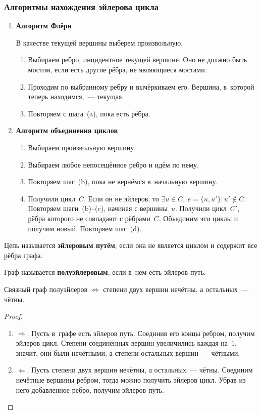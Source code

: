\subsubsection{Алгоритмы нахождения эйлерова цикла}
\begin{enumerate}
	\item {} \textbf{Алгоритм Флёри}
	
	В качестве текущей вершины выберем произвольную.
	\begin{enumerate}
		\item Выбираем ребро, инцидентное текущей вершине.
		Оно не должно быть мостом, если есть другие рёбра, не являющиеся мостами.
		\item Проходим по выбранному ребру и вычёркиваем его.
		Вершина, в~которой теперь находимся,~--- текущая.
		\item Повторяем с шага~(a), пока есть рёбра.
	\end{enumerate}
	
	\item {} \textbf{Алгоритм объединения циклов}
	\begin{enumerate}
		\item Выбираем произвольную вершину.
		\item Выбираем любое непосещённое ребро и идём по нему.
		\item Повторяем шаг~(b), пока не вернёмся в~начальную вершину.
		\item Получили цикл~$C$.
		Если он не эйлеров, то $\exists u \in C, \ e = \{ u, u' \} \colon u' \notin C$.
		Повторяем шаги~(b)--(c), начиная с вершины~$u$.
		Получили цикл~$C'$, рёбра которого не совпадают с рёбрами~$C$.
		Объединим эти циклы и получим новый.
		Повторяем шаг~(d).
	\end{enumerate}
\end{enumerate}

Цепь называется \textbf{эйлеровым путём}, если она не является циклом и содержит все рёбра графа.

 Граф называется \textbf{полуэйлеровым}, если в~нём есть эйлеров путь.

\begin{theorem}
Связный граф полуэйлеров $\Leftrightarrow$ степени двух вершин нечётны, а остальных~--- чётны.
\end{theorem}
\begin{proof}
\begin{enumerate}
	\item $\Rightarrow$. Пусть в~графе есть эйлеров путь.
	Соединив его концы ребром, получим эйлеров цикл.
	Степени соединённых вершин увеличились каждая на~$1$, значит, они были нечётными, а степени остальных вершин~--- чётными.
	\item $\Leftarrow$. Пусть степени двух вершин нечётны, а остальных~--- чётны.
	Соединим нечётные вершины ребром, тогда можно получить эйлеров цикл.
	Убрав из него добавленное ребро, получим эйлеров путь.
\end{enumerate}
\end{proof}

